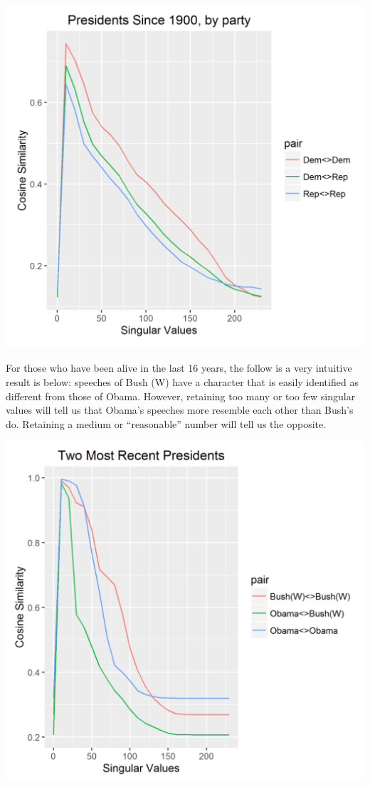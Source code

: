 \documentclass[a4paper, 11pt]{article}
\begin{document}
\begin{center}
\includegraphics[scale=0.45]{plot1.png}
\end{center}
For those who have been alive in the last 16 years, the follow is a very intuitive result is below: speeches of Bush (W) have a character that is easily identified as different from those of Obama. However, retaining too many or too few singular values will tell us that Obama’s speeches more resemble each other than Bush’s do. Retaining a medium or “reasonable” number will tell us the opposite.
\begin{center}
\includegraphics[scale=0.45]{plot2.png}
\end{center}
\end{document}
